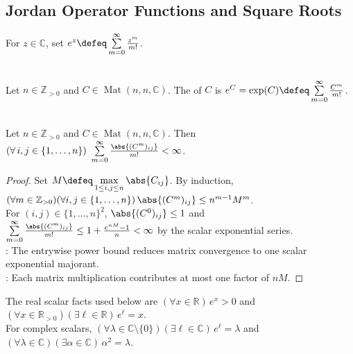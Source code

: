 \subsection{Jordan Operator Functions and Square Roots}

For $z\in\mathbb{C}$, set $e^z\defeq\sum\limits_{m=0}^{\infty}\frac{z^m}{m!}$.
\begin{definition} \label{def:matrix-exponential} \\
Let $n\in\mathbb{Z}_{>0}$ and $C\in\operatorname{Mat}(n,n,\mathbb{C})$. The  of $C$ is $e^C=\exp(C)\defeq\sum\limits_{m=0}^{\infty}\frac{C^m}{m!}$.
\end{definition}

\begin{proposition} \label{prop:matrix-exponential-entrywise-absolute-convergence} \\
Let $n\in\mathbb{Z}_{>0}$ and $C\in\operatorname{Mat}(n,n,\mathbb{C})$. Then $(\forall\,i,j\in\{1,\ldots,n\})\ \sum\limits_{m=0}^{\infty}\frac{\abs{(C^m)_{ij}}}{m!}<\infty$.
\begin{proof} Set $M\defeq\max\limits_{1\leq i,j\leq n}\abs{C_{ij}}$. By induction, $(\forall m\in\mathbb{Z}_{>0})(\forall i,j\in\{1,\ldots,n\})\,\abs{(C^m)_{ij}}\leq n^{m-1}M^m$.\\
For $(i,j)\in\{1,\ldots,n\}^2$, $\abs{(C^0)_{ij}}\leq1$ and $\sum\limits_{m=0}^{\infty}\frac{\abs{(C^m)_{ij}}}{m!}\leq1+\frac{e^{nM}-1}{n}<\infty$ by the scalar exponential series.\\
: The entrywise power bound reduces matrix convergence to one scalar exponential majorant.\\
: Each matrix multiplication contributes at most one factor of $nM$.
\end{proof}
\end{proposition}

The real scalar facts used below are $(\forall x\in\mathbb{R})\,e^x>0$ and $(\forall x\in\mathbb{R}_{>0})(\exists\ell\in\mathbb{R})\,e^{\ell}=x$.\\
For complex scalars, $(\forall\lambda\in\mathbb{C}\setminus\{0\})(\exists\ell\in\mathbb{C})\,e^{\ell}=\lambda$ and $(\forall\lambda\in\mathbb{C})(\exists\alpha\in\mathbb{C})\,\alpha^2=\lambda$.

